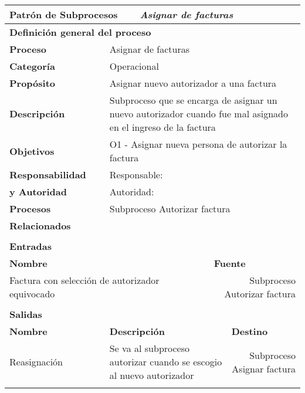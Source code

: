 \begin{longtable}{|llrrrrrr|}
	\hline
	\multicolumn{2}{|l|}{\textbf{Patrón de Subprocesos}} & \multicolumn{6}{|l|}{\textit{Asignar de facturas}} \\ \hline
	\multicolumn{8}{|l|}{\textbf{Definición general del proceso}} \\ \hline
	\textbf{Proceso} & \multicolumn{7}{|m{12cm}|}{Asignar de facturas} \\ \hline
	\textbf{Categoría} & \multicolumn{7}{|m{12cm}|}{Operacional} \\ \hline
	\textbf{Propósito} & \multicolumn{7}{|m{12cm}|}{Asignar nuevo autorizador a una factura} \\ \hline
    \textbf{Descripción} & \multicolumn{7}{|m{12cm}|}{Subproceso que se encarga de asignar un nuevo autorizador cuando fue mal asignado en el ingreso de la factura} \\ \hline
	\multirow{0}[6]{*}{\textbf{Objetivos}} 
          & \multicolumn{7}{|l|}{O1 -  Asignar nueva persona de autorizar la factura} \\ \hline
    \multicolumn{1}{|l|}{\textbf{Responsabilidad}} 	& \multicolumn{7}{|l|}{Responsable: } \\
	\multicolumn{1}{|l|}{\textbf{y Autoridad}} 	& \multicolumn{7}{|l|}{Autoridad: } \\ \hline
    \multicolumn{1}{|l|}{\textbf{Procesos}} 	& \multicolumn{7}{|m{12cm}|}{Subproceso Autorizar factura} \\
	\multicolumn{1}{|l|}{\textbf{Relacionados}} 	&  \multicolumn{7}{|m{12cm}|}{} \\ \hline
          &       &       &       &       &       &       &  \\ \hline
    \multicolumn{8}{|l|}{\textbf{Entradas}} \\ \hline
    \multicolumn{5}{|l|}{\textbf{Nombre}}   & \multicolumn{3}{|l|}{\textbf{Fuente}} \\ \hline
    \multicolumn{5}{|l|}{Factura con selección de autorizador equivocado} & \multicolumn{3}{|m{3.5cm}|}{Subproceso Autorizar factura} \\  \hline
       &       &       &       &       &       &       &  \\ \hline
    \multicolumn{8}{|l|}{\textbf{Salidas}} \\ \hline
    \textbf{Nombre} & \multicolumn{5}{|l|}{\textbf{Descripción}} & \multicolumn{2}{|l|}{\textbf{Destino}} \\ \hline
    Reasignación & \multicolumn{5}{|m{6cm}|}{Se va al subproceso autorizar cuando se escogio al nuevo autorizador} & \multicolumn{2}{|m{3cm}|}{Subproceso Asignar factura} \\ \hline
       &       &       &       &       &       &       &  \\ \hline
	

\end{longtable}
